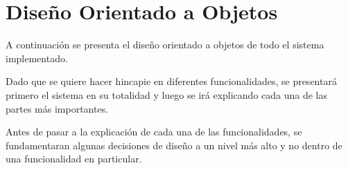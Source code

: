 \section{Dise\~{n}o Orientado a Objetos}

A continuaci\'on se presenta el diseño orientado a objetos de todo el sistema implementado.

Dado que se quiere hacer hincapie en diferentes funcionalidades, se presentar\'a primero el sistema en su totalidad y luego se ir\'a explicando cada una de las partes m\'as importantes.




Antes de pasar a la explicaci\'on de cada una de las funcionalidades, se fundamentaran algunas decisiones de dise\~{n}o a un nivel m\'as alto y no dentro de una funcionalidad en particular.


